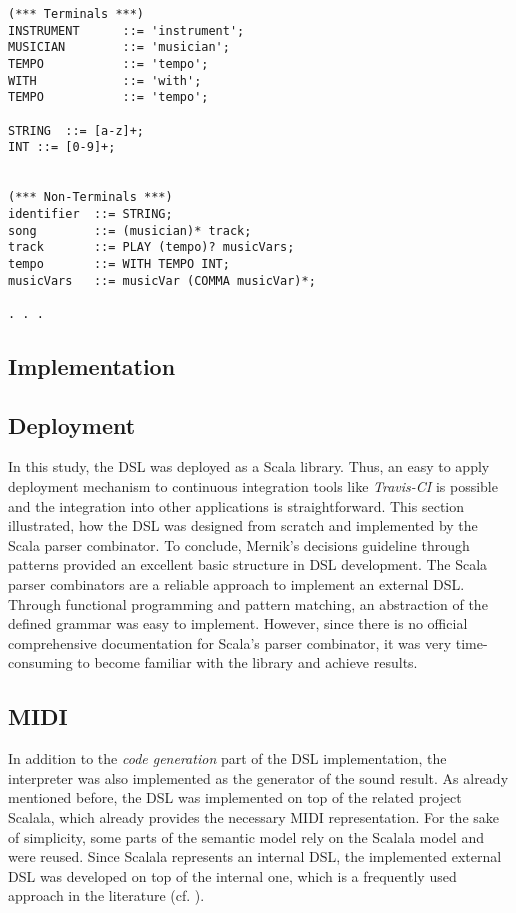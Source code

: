 \begin{lstlisting}[caption={EBNF (truncated).}, label=LS_EBNF_TRUNC]
(*** Terminals ***)
INSTRUMENT		::=	'instrument';
MUSICIAN		::=	'musician';
TEMPO			::=	'tempo';
WITH			::=	'with';
TEMPO			::=	'tempo';

STRING	::=	[a-z]+;
INT	::=	[0-9]+;


(*** Non-Terminals ***)
identifier	::=	STRING;
song		::=	(musician)* track;   
track		::=	PLAY (tempo)? musicVars;
tempo		::=	WITH TEMPO INT;
musicVars	::=	musicVar (COMMA musicVar)*;
	
. . .
\end{lstlisting}

\subsection{Implementation}
\label{IMPL_SCALALA_IMPL}



\subsection{Deployment}
\label{IMPL_SCALALA_DEPL}
In this study, the DSL was deployed as a Scala library. Thus, an easy to apply deployment mechanism to continuous integration tools like \textit{Travis-CI} is possible and the integration into other applications is straightforward.
\newline
\newline
This section illustrated, how the DSL was designed from scratch and implemented by the Scala parser combinator. To conclude, Mernik's decisions guideline\cite{Mernik2005} through patterns provided an excellent basic structure in DSL development. The Scala parser combinators are a reliable approach to implement an external DSL. Through functional programming and pattern matching, an abstraction of the defined grammar was easy to implement. However, since there is no official comprehensive documentation for Scala's parser combinator, it was very time-consuming to become familiar with the library and achieve results.


\subsection{MIDI}
\label{IMPL_SCALALA_MIDI}
In addition to the \textit{code generation} part of the DSL implementation, the interpreter was also implemented as the generator of the sound result. As already mentioned before, the DSL was implemented on top of the related project Scalala, which already provides the necessary MIDI representation. For the sake of simplicity, some parts of the semantic model rely on the Scalala model and were reused. Since Scalala represents an internal DSL, the implemented external DSL was developed on top of the internal one, which is a frequently used approach in the literature (cf. \cite{Fowler2010}).


